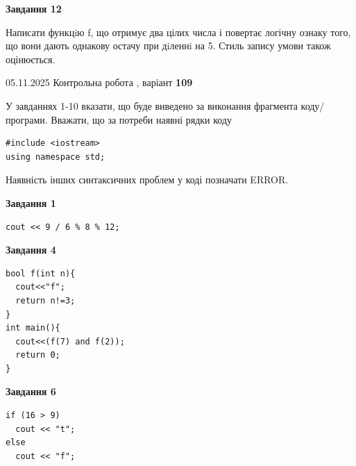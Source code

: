 \documentclass[12pt, ukrainian]{article}
\begin{document}
{\begin {large}
\begin{minipage}[t]{11.0cm}
\begin{center}
\textbf{Завдання 12}
\end{center}

Написати функцiю f, що отримує два цілих числа і повертає логічну ознаку того, що вони дають однакову остачу при дiленнi на 5. Стиль запису умови також оцінюється.\par

\end{minipage}

\end {large}}
\newpage

{\Large{05.11.2025 Контрольна робота , варіант  \No \textbf { 109 }\par}}
{
\begin {large}
У завданнях 1-10 вказати, що буде виведено за виконання фрагмента коду/про\-гра\-ми.
Вважати, що за потреби наявні рядки коду
\begin{verbatim}
#include <iostream>
using namespace std;
\end{verbatim}
Наявність інших синтаксичних проблем у коді позначати ERROR.

\begin{minipage}[t]{7.0cm}

\begin{center}
\textbf{Завдання 1}
\end{center}
\vspace{-8mm}

\begin{verbatim}
cout << 9 / 6 % 8 % 12;
\end{verbatim}



\begin{center}
\textbf{Завдання 4}
\end{center}
\vspace{-8mm}

\begin{verbatim}
bool f(int n){
  cout<<"f";
  return n!=3;
}
int main(){
  cout<<(f(7) and f(2));
  return 0;
}
\end{verbatim}



\begin{center}
\textbf{Завдання 6}
\end{center}
\vspace{-8mm}

\begin{verbatim}
if (16 > 9)
  cout << "t";
else
  cout << "f";
\end{verbatim}




\end{minipage}
\end{large}}
\end{document}
